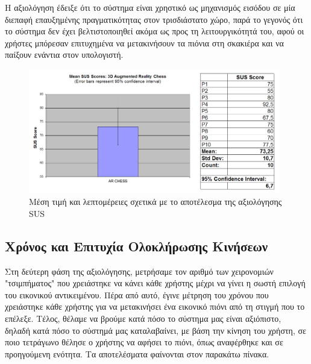 Η αξιολόγηση έδειξε ότι το σύστημα είναι χρηστικό ως μηχανισμός εισόδου σε μία διεπαφή επαυξημένης πραγματικότητας στον τρισδιάστατο χώρο, παρά το γεγονός ότι το σύστημα δεν έχει βελτιστοποιηθεί ακόμα ως προς τη λειτουργικότητά του, αφού οι χρήστες μπόρεσαν επιτυχημένα να μετακινήσουν τα πιόνια στη σκακιέρα και να παίξουν ενάντια στον υπολογιστή. 

\begin{figure}[H]
    \centering
    \includegraphics[width=0.98\textwidth]{Files/Figures/sus.png}
    \caption[Μέση τιμή και λεπτομέρειες σχετικά με το αποτέλεσμα της αξιολόγησης SUS]{Μέση τιμή και λεπτομέρειες σχετικά με το αποτέλεσμα της αξιολόγησης SUS}
    \label{fig:sus_res}
\end{figure}


\subsection{Χρόνος και Επιτυχία Ολοκλήρωσης Κινήσεων}


Στη δεύτερη φάση της αξιολόγησης, μετρήσαμε τον αριθμό των χειρονομιών "τσιμπήματος" που χρειάστηκε να κάνει κάθε χρήστης μέχρι να γίνει η σωστή επιλογή του εικονικού αντικειμένου. Πέρα από αυτό, έγινε μέτρηση του χρόνου που χρειάστηκε κάθε χρήστης για να μετακινήσει ένα εικονικό πιόνι από τη στιγμή που το επέλεξε. Τέλος, θέλαμε να βρούμε κατά πόσο το σύστημα μας είναι αξιόπιστο, δηλαδή κατά πόσο το σύστημά μας καταλαβαίνει, με βάση την κίνηση του χρήστη, σε ποιο τετράγωνο θέλησε ο χρήστης να αφήσει το πιόνι, όπως αναφέρθηκε και σε προηγούμενη ενότητα. Τα αποτελέσματα φαίνονται στον παρακάτω πίνακα.


